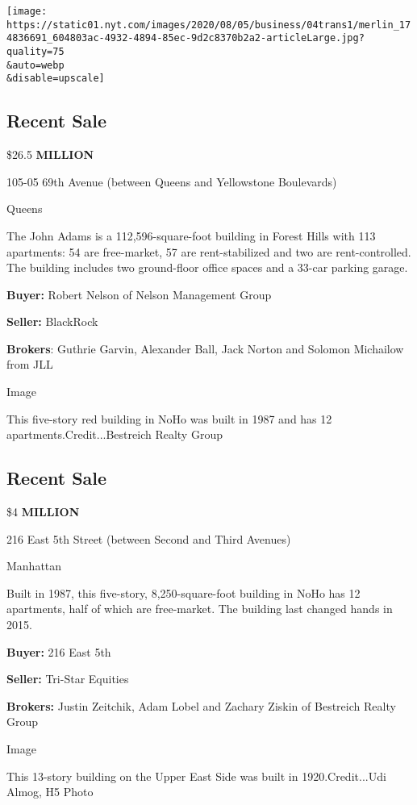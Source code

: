 \texttt{[image: https://static01.nyt.com/images/2020/08/05/business/04trans1/merlin\_174836691\_604803ac-4932-4894-85ec-9d2c8370b2a2-articleLarge.jpg?quality=75\\\&auto=webp\\\&disable=upscale]}

\hypertarget{recent-sale}{%
\subsection{Recent Sale}\label{recent-sale}}

\$26.5 \textbf{MILLION}

105-05 69th Avenue (between Queens and Yellowstone Boulevards)

Queens

The John Adams is a 112,596-square-foot building in Forest Hills with
113 apartments: 54 are free-market, 57 are rent-stabilized and two are
rent-controlled. The building includes two ground-floor office spaces
and a 33-car parking garage.

\textbf{Buyer:} Robert Nelson of Nelson Management Group

\textbf{Seller:} BlackRock

\textbf{Brokers}: Guthrie Garvin, Alexander Ball, Jack Norton and
Solomon Michailow from JLL

Image

This five-story red building in NoHo was built in 1987 and has 12
apartments.Credit...Bestreich Realty Group

\hypertarget{recent-sale-1}{%
\subsection{Recent Sale}\label{recent-sale-1}}

\$4 \textbf{MILLION}

216 East 5th Street (between Second and Third Avenues)

Manhattan

Built in 1987, this five-story, 8,250-square-foot building in NoHo has
12 apartments, half of which are free-market. The building last changed
hands in 2015.

\textbf{Buyer:} 216 East 5th

\textbf{Seller:} Tri-Star Equities

\textbf{Brokers:} Justin Zeitchik, Adam Lobel and Zachary Ziskin of
Bestreich Realty Group

Image

This 13-story building on the Upper East Side was built in
1920.Credit...Udi Almog, H5 Photo

